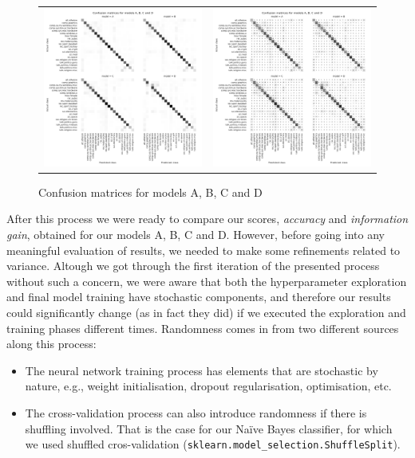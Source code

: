 \documentclass[10pt,journal,compsoc, onecolumn]{IEEEtran}
\begin{document}
\begin{figure}[h]
\begin{tabular}{c c}
    \includegraphics[width=.50\linewidth]{images/chart_20.pdf} &
    \includegraphics[width=.50\linewidth]{images/chart_21.pdf} \\
\end{tabular}
\caption{Confusion matrices for models A, B, C and D}
\label{fig:confusionmatrix}
\end{figure}

After this process we were ready to compare our scores, \textit{accuracy} and \textit{information gain}, obtained for our models A, B, C and D. However, before going into any meaningful evaluation of results, we needed to make some refinements related to variance. Altough we got through the first iteration of the presented process without such a concern, we were aware that both the hyperparameter exploration and final model training have stochastic components, and therefore our results could significantly change (as in fact they did) if we executed the exploration and training phases different times. Randomness comes in from two different sources along this process:

\begin{itemize}
    \item The neural network training process has elements that are stochastic by nature, e.g., weight initialisation, dropout regularisation, optimisation, etc.
    \item The cross-validation process can also introduce randomness if there is shuffling involved. That is the case for our Naïve Bayes classifier, for which we used shuffled cros-validation (\verb|sklearn.model_selection.ShuffleSplit|).
\end{itemize}
\end{document}
